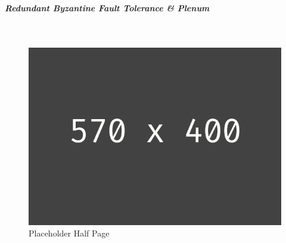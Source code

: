 \subparagraph{Redundant Byzantine Fault Tolerance \& Plenum}$~~$\\
\begin{figure}[h!]
	\centering
	\includegraphics[width=1.0\linewidth]{pictures/placeholder_half_page}
	\caption[Placeholder Half Page]{Placeholder Half Page}
	\label{fig:placeholder_half_page}
\end{figure}
